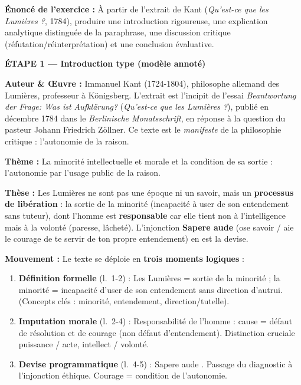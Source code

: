 \documentclass[11pt]{article}
\newcommand{\cle}[1]{{\popxbold\color{popdark}#1}}
\newcounter{popsec}
\newcounter{popsub}
\newcommand{\courssub}[1]{%
  \stepcounter{popsub}%
  \par\vspace{9pt}\noindent{\popxbold\fontsize{11.5}{13}\selectfont\color{popink}{\color{poporange}\thepopsec.\thepopsub}\hspace{6pt}#1}\par\nopagebreak\vspace{4pt}
}
\begin{document}
\courssub{Démarche et corrigé commenté}
\begin{exoresolu}
\textbf{Énoncé de l'exercice :} À partir de l'extrait de Kant (\emph{Qu'est-ce que les Lumières ?}, 1784), produire une introduction rigoureuse, une explication analytique distinguée de la paraphrase, une discussion critique (réfutation/réinterprétation) et une conclusion évaluative.

\tcblower

\textbf{ÉTAPE 1 — Introduction type (modèle annoté)}

\guillemotleft \textbf{Auteur \& Œuvre :} Immanuel Kant (1724-1804), philosophe allemand des Lumières, professeur à Königsberg. L'extrait est l'incipit de l'essai \emph{Beantwortung der Frage: Was ist Aufklärung?} (\emph{Qu'est-ce que les Lumières ?}), publié en décembre 1784 dans le \emph{Berlinische Monatsschrift}, en réponse à la question du pasteur Johann Friedrich Zöllner. Ce texte est le \emph{manifeste} de la philosophie critique : l'autonomie de la raison.

\textbf{Thème :} La \cle{minorité} intellectuelle et morale et la condition de sa sortie : l'\cle{autonomie} par l'\cle{usage public de la raison}.

\textbf{Thèse :} Les Lumières ne sont pas une époque ni un savoir, mais un \textbf{processus de libération} : la sortie de la \cle{minorité} (incapacité à user de son entendement sans tuteur), dont l'homme est \textbf{responsable} car elle tient non à l'intelligence mais à la \cle{volonté} (paresse, lâcheté). L'injonction \guillemotleft \textbf{Sapere aude} \guillemotright (ose savoir / aie le courage de te servir de ton propre entendement) en est la devise.

\textbf{Mouvement :} Le texte se déploie en \textbf{trois moments logiques} :
\begin{enumerate}
    \item \textbf{Définition formelle} (l.~1-2) : Les Lumières = sortie de la minorité ; la minorité = incapacité d'user de son entendement sans direction d'autrui. (Concepts clés : minorité, entendement, direction/tutelle).
    \item \textbf{Imputation morale} (l.~2-4) : Responsabilité de l'homme : cause = défaut de résolution et de courage (non défaut d'entendement). Distinction cruciale \cle{puissance / acte}, \cle{intellect / volonté}.
    \item \textbf{Devise programmatique} (l.~4-5) : \guillemotleft Sapere aude \guillemotright. Passage du diagnostic à l'injonction éthique. Courage = condition de l'autonomie.
\end{enumerate} \guillemotright


\end{exoresolu}
\end{document}
